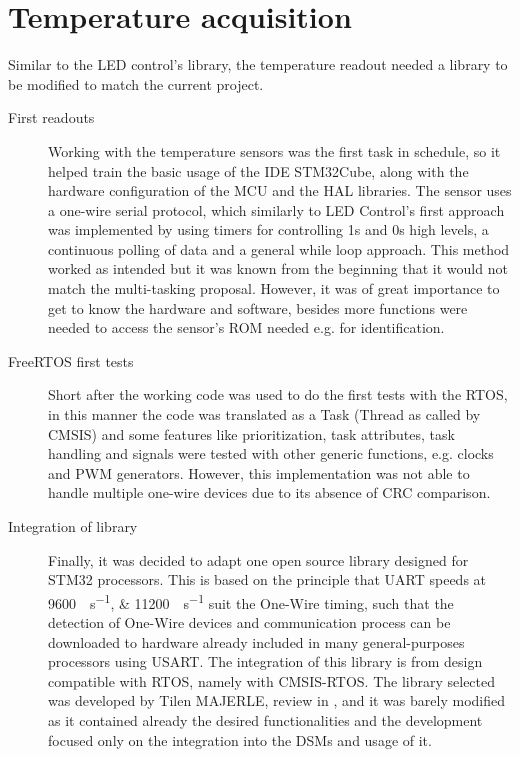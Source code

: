 \section{Temperature acquisition}\label{sec:temperature}

Similar to the LED control's library, the temperature readout needed a library to be modified to match the current project.
\begin{description}
\item[First readouts] Working with the temperature sensors was the first task in schedule, so it helped train the basic usage
    of the IDE STM32Cube, along with the hardware configuration of the MCU and the HAL libraries. 
    The sensor uses a one-wire serial protocol, which similarly to LED Control's first approach was implemented by using 
    timers for controlling 1s and 0s high levels, a continuous polling of data and a general while loop approach. 
    This method worked as intended but it was known from the beginning that it would not match the multi-tasking proposal. 
    However, it was of great importance to get to know the hardware and software, besides more functions were needed to 
    access the sensor's ROM needed e.g. for identification.
\item[FreeRTOS first tests] Short after the working code was used to do the first tests with the RTOS, 
    in this manner the code was translated as a Task (Thread as called by CMSIS) and some features like prioritization, 
    task attributes, task handling and signals were tested with other generic functions, e.g. clocks and PWM generators. 
    However, this implementation was not able to handle multiple one-wire devices due to its absence of CRC comparison.
\item[Integration of library] Finally, it was decided to adapt one open source library designed for STM32 processors. 
    This is based on the principle that UART speeds at \SIlist{9600;11200}{\bit\per\second} suit the One-Wire timing, such that the 
    detection of One-Wire devices and communication process can be downloaded to hardware already included in many 
    general-purposes processors using USART. The integration of this library is from design compatible with RTOS, 
    namely with CMSIS-RTOS. The library selected was developed by Tilen MAJERLE, review in \cite{temp_library}, and it 
    was barely modified as it contained already the desired functionalities and the development
    focused only on the integration into the DSMs and usage of it. 
\end{description}

